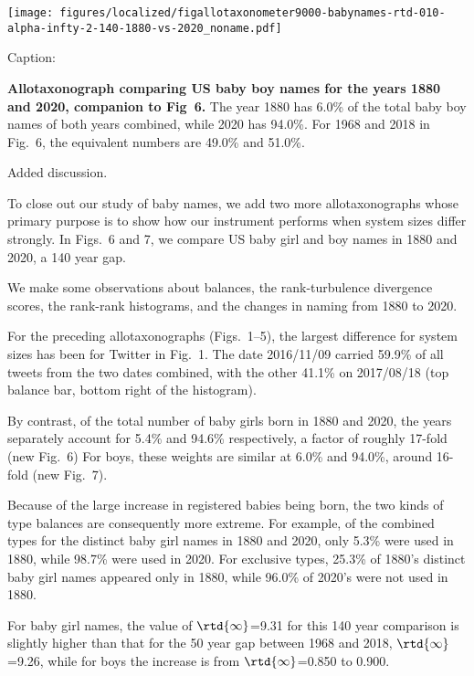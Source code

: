 \texttt{[image: figures/localized/figallotaxonometer9000-babynames-rtd-010-alpha-infty-2-140-1880-vs-2020\_noname.pdf]}

Caption:

\begin{excerpt}
  \textbf{Allotaxonograph comparing US baby boy names for the years 1880 and 2020,
    companion to Fig~6.}
  The year 1880 has 6.0\% of the total baby boy names of both years combined,
  while 2020 has 94.0\%.
  For 1968 and 2018 in Fig.~6,
  the equivalent numbers are 49.0\% and 51.0\%.
\end{excerpt}

Added discussion.

\begin{excerpt}
  To close out our study of baby names, we add two more allotaxonographs
  whose primary purpose is to show how our instrument performs when system sizes differ strongly.
  In Figs.~6 and 7,
  we compare US baby girl and boy names in 1880 and 2020, a 140 year gap.

  We make some observations about balances,
  the rank-turbulence divergence scores,
  the rank-rank histograms,
  and
  the changes in naming from 1880 to 2020.

  For the preceding allotaxonographs
  (Figs.~1--5),
  the largest difference for system sizes has been for
  Twitter in Fig.~1.
  The date 2016/11/09 carried 59.9\% of all tweets from the two dates combined,
  with the other 41.1\% on 2017/08/18
  (top balance bar, bottom right of the histogram).

  By contrast, of the total number of baby girls born in 1880 and 2020,
  the years separately account for 5.4\% and 94.6\% respectively,
  a factor of roughly 17-fold
  (new Fig.~6)
  For boys, these weights are similar at 6.0\% and 94.0\%, around 16-fold
  (new Fig.~7).

  Because of the large increase in registered babies being born,
  the two kinds of type balances are consequently more extreme.
  For example, of the combined types for the distinct baby girl names in 1880 and 2020,
  only 5.3\% were used in 1880, while 98.7\% were used in 2020.
  For exclusive types, 25.3\% of 1880's distinct baby girl names appeared
  only in 1880, while 96.0\% of 2020's were not used in 1880.

  For baby girl names, the value of $\rtd{\infty}$=9.31 for this 140 year comparison is slightly higher
  than that for the 50 year gap between 1968 and 2018, $\rtd{\infty}$=9.26,
  while for boys the increase is from $\rtd{\infty}$=0.850 to 0.900.


\end{excerpt}
